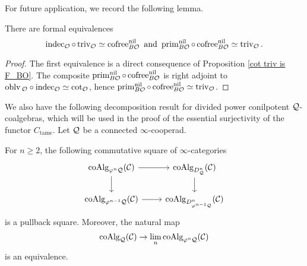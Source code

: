 For future application, we record the following lemma.
\begin{lemma}
\cite[(3.4) and (3.5)]{Francis-Gaitsgory}
\label{CE of Trivial is cofree}
There are formal equivalences
$$
\operatorname{indec}_{{\mathcal{O}}}\circ\operatorname{triv}_{{\mathcal{O}}} \simeq \operatorname{cofree}^{\operatorname{nil}}_{B{\mathcal{O}}}  \text{ and } 
\operatorname{prim}_{B{\mathcal{O}}}^{\operatorname{nil}} \circ \operatorname{cofree}^{\operatorname{nil}}_{B{\mathcal{O}}} \simeq \operatorname{triv}_{{\mathcal{O}}}.
$$
\end{lemma}
\begin{proof}
    The first equivalence is a direct consequence of Proposition \ref{cot triv is F_BO}.
    The composite $\operatorname{prim}_{B{\mathcal{O}}}^{\operatorname{nil}} \circ \operatorname{cofree}^{\operatorname{nil}}_{B{\mathcal{O}}}$ is right adjoint to
    $\operatorname{oblv}{_{{\mathcal{O}}}\circ \operatorname{indec}_{{\mathcal{O}}}}\simeq \cot_{{\mathcal{O}}}$, hence $\operatorname{prim}_{B{\mathcal{O}}}^{\operatorname{nil}} \circ \operatorname{cofree}^{\operatorname{nil}}_{B{\mathcal{O}}} \simeq \operatorname{triv}_{{\mathcal{O}}}$.
\end{proof}



We also have the following decomposition result for divided power conilpotent ${\mathcal{Q}}$-coalgebras, which will be used in the proof of the essential surjectivity of the functor $C_{\operatorname{tame}}$. Let ${\mathcal{Q}}$ be a connected $\infty$-cooperad.
\begin{proposition}
\cite[Theorem 4.12]{Heuts_Koszul}
\label{inductive construction of coalgebras}
    For $n\geq 2$, the following commutative square of $\infty$-categories 
\[
\begin{tikzcd}
	\coAlg_{\varphi^n \CQ}(\CC) & 
	\coAlg_{D^n_{\CQ}}(\CC)\\
	\coAlg_{\varphi^{n-1} \CQ}(\CC) & 
	\coAlg_{D^n_{\varphi^{n-1}\CQ}}(\CC)
	\arrow[from=1-1, to= 1-2]
	\arrow[from=1-1, to=2-1]
	\arrow[from=1-2, to=2-2]
	\arrow[from=2-1, to= 2-2]
\end{tikzcd}
\]
is a pullback square. Moreover, the natural map
$$
\operatorname{coAlg}_{{\mathcal{Q}}}({\mathcal{C}}) \to \lim_n \operatorname{coAlg}_{\varphi^n{\mathcal{Q}}}({\mathcal{C}})
$$
is an equivalence.
\end{proposition}


